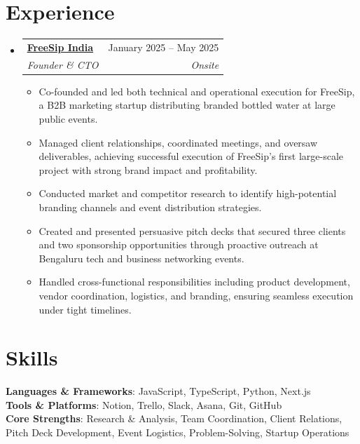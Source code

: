 \documentclass[letterpaper,11pt]{article}
\makeatletter
\newcommand{\resumeItem}[1]{
  \item\small{
    {#1 \vspace{-2pt}}
  }
}
\newcommand{\resumeSubheading}[4]{
  \vspace{-2pt}\item
    \begin{tabular*}{0.97\textwidth}[t]{l@{\extracolsep{\fill}}r}
      \textbf{#1} & #2 \\
      \textit{\small#3} & \textit{\small #4} \\
    \end{tabular*}\vspace{-7pt}
}
\newcommand{\resumeSubHeadingListStart}{\begin{itemize}[leftmargin=0.15in, label={}]}
\newcommand{\resumeSubHeadingListEnd}{\end{itemize}}
\newcommand{\resumeItemListStart}{\begin{itemize}}
\newcommand{\resumeItemListEnd}{\end{itemize}\vspace{-5pt}}
\makeatother
\begin{document}
 
\section{Experience}
\resumeSubHeadingListStart

\resumeSubheading
{\href{https://freesipindia.xyz/}{\underline{FreeSip India}}}{January 2025 – May 2025}
{Founder \& CTO}{Onsite}
\resumeItemListStart
  \resumeItem{Co-founded and led both technical and operational execution for FreeSip, a B2B marketing startup distributing branded bottled water at large public events.}
  \resumeItem{Managed client relationships, coordinated meetings, and oversaw deliverables, achieving successful execution of FreeSip’s first large-scale project with strong brand impact and profitability.}
  \resumeItem{Conducted market and competitor research to identify high-potential branding channels and event distribution strategies.}
  \resumeItem{Created and presented persuasive pitch decks that secured three clients and two sponsorship opportunities through proactive outreach at Bengaluru tech and business networking events.}
  \resumeItem{Handled cross-functional responsibilities including product development, vendor coordination, logistics, and branding, ensuring seamless execution under tight timelines.}
\resumeItemListEnd

\resumeSubHeadingListEnd


\vspace{-10pt}


\section{Skills}
\begin{itemize}[leftmargin=0.15in, label={}]
    \small{\item{
        \textbf{Languages \& Frameworks}{: JavaScript, TypeScript, Python, Next.js} \\
        \textbf{Tools \& Platforms}{: Notion, Trello, Slack, Asana, Git, GitHub} \\
        \textbf{Core Strengths}{: Research \& Analysis, Team Coordination, Client Relations, Pitch Deck Development, Event Logistics, Problem-Solving, Startup Operations} 
    }}
\end{itemize}
\vspace{-15pt}



\end{document}

